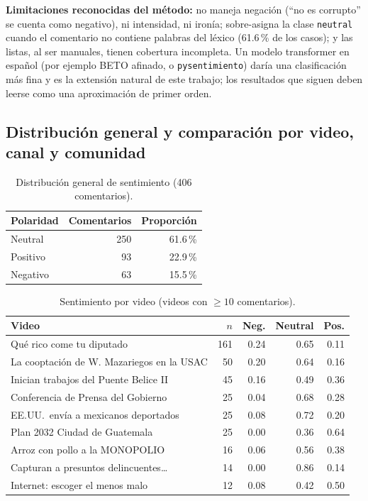 \documentclass[11pt,a4paper]{article}
\begin{document}
\textbf{Limitaciones reconocidas del m\'etodo:} no maneja negaci\'on (``no es corrupto'' se cuenta como
negativo), ni intensidad, ni iron\'ia; sobre-asigna la clase \texttt{neutral} cuando el comentario no
contiene palabras del l\'exico (61.6\,\% de los casos); y las listas, al ser manuales, tienen cobertura
incompleta. Un modelo transformer en espa\~nol (por ejemplo BETO afinado, o \texttt{pysentimiento})
dar\'ia una clasificaci\'on m\'as fina y es la extensi\'on natural de este trabajo; los resultados que
siguen deben leerse como una aproximaci\'on de primer orden.

\subsection{Distribuci\'on general y comparaci\'on por video, canal y comunidad}
\begin{table}[H]
\centering
\caption{Distribuci\'on general de sentimiento (406 comentarios).}
\begin{tabular}{l r r}
\toprule
Polaridad & Comentarios & Proporci\'on \\
\midrule
Neutral & 250 & 61.6\,\% \\
Positivo & 93 & 22.9\,\% \\
Negativo & 63 & 15.5\,\% \\
\bottomrule
\end{tabular}
\end{table}

\begin{table}[H]
\centering
\caption{Sentimiento por video (videos con $\geq 10$ comentarios).}
\small
\begin{tabular}{l r r r r}
\toprule
Video & $n$ & Neg. & Neutral & Pos. \\
\midrule
Qu\'e rico come tu diputado & 161 & 0.24 & 0.65 & 0.11 \\
La cooptaci\'on de W. Mazariegos en la USAC & 50 & 0.20 & 0.64 & 0.16 \\
Inician trabajos del Puente Belice II & 45 & 0.16 & 0.49 & 0.36 \\
Conferencia de Prensa del Gobierno & 25 & 0.04 & 0.68 & 0.28 \\
EE.UU.\ env\'ia a mexicanos deportados & 25 & 0.08 & 0.72 & 0.20 \\
Plan 2032 Ciudad de Guatemala & 25 & 0.00 & 0.36 & 0.64 \\
Arroz con pollo a la MONOPOLIO & 16 & 0.06 & 0.56 & 0.38 \\
Capturan a presuntos delincuentes\dots & 14 & 0.00 & 0.86 & 0.14 \\
Internet: escoger el menos malo & 12 & 0.08 & 0.42 & 0.50 \\
\bottomrule
\end{tabular}
\end{table}
\end{document}
